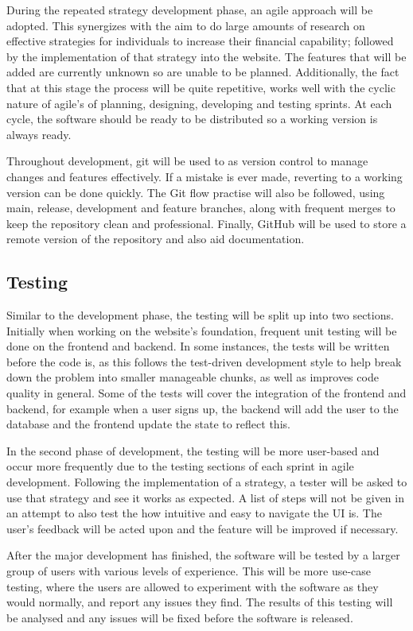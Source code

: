 During the repeated strategy development phase, an agile approach will be adopted. This synergizes with the aim to do large amounts of research on effective strategies for individuals to increase their financial capability; followed by the implementation of that strategy into the website. The features that will be added are currently unknown so are unable to be planned. Additionally, the fact that at this stage the process will be quite repetitive, works well with the cyclic nature of agile's of planning, designing, developing and testing sprints. At each cycle, the software should be ready to be distributed so a working version is always ready.

Throughout development, git will be used to as version control to manage changes and features effectively. If a mistake is ever made, reverting to a working version can be done quickly. The Git flow practise will also be followed, using main, release, development and feature branches, along with frequent merges to keep the repository clean and professional. Finally, GitHub will be used to store a remote version of the repository and also aid documentation.

\subsection{Testing}
Similar to the development phase, the testing will be split up into two sections. Initially when working on the website's foundation, frequent unit testing will be done on the frontend and backend. In some instances, the tests will be written before the code is, as this follows the test-driven development style to help break down the problem into smaller manageable chunks, as well as improves code quality in general. Some of the tests will cover the integration of the frontend and backend, for example when a user signs up, the backend will add the user to the database and the frontend update the state to reflect this.

In the second phase of development, the testing will be more user-based and occur more frequently due to the testing sections of each sprint in agile development. Following the implementation of a strategy, a tester will be asked to use that strategy and see it works as expected. A list of steps will not be given in an attempt to also test the how intuitive and easy to navigate the UI is. The user's feedback will be acted upon and the feature will be improved if necessary.

After the major development has finished, the software will be tested by a larger group of users with various levels of experience. This will be more use-case testing, where the users are allowed to experiment with the software as they would normally, and report any issues they find. The results of this testing will be analysed and any issues will be fixed before the software is released.